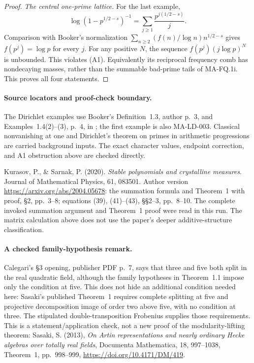 \begin{proof}
\emph{The central one-prime lattice.}
For the last example,
\[
 \log(1-p^{1/2-s})^{-1}
         =\sum_{j\ge1}\frac{p^{j(1/2-s)}}j.
\]
Comparison with Booker's normalization
$\sum_{n\ge2}(f(n)/\log n)n^{1/2-s}$
gives $f(p^j)=\log p$ for every $j$.
For any positive $N$, the sequence
$f(p^j)(j\log p)^N$ is unbounded.
This violates (A1).  Equivalently its reciprocal
frequency comb has nondecaying masses, rather than
the summable bad-prime tails of MA-FQ.1i.
This proves all four statements.
\end{proof}

\paragraph{Source locators and proof-check boundary.}
The Dirichlet examples use Booker's Definition~1.3,
author p.~3, and Examples~1.4(2)--(3), p.~4, in
; the first example is also
MA-LD-003.  Classical nonvanishing at one and
Dirichlet's theorem on primes in arithmetic progressions
are carried background inputs.  The exact character
values, endpoint correction, and A1 obstruction above
are checked directly.

Kurasov, P., \& Sarnak, P. (2020).
\emph{Stable polynomials and crystalline measures}.
Journal of Mathematical Physics, 61, 083501.
Author version \url{https://arxiv.org/abs/2004.05678}:
the summation formula and Theorem~1 with proof,
\S2, pp.~3--8; equations (39), (41)--(43),
\S\S2--3, pp.~8--10.  The complete invoked summation
argument and Theorem~1 proof were read in this run.
The matrix calculation above does not use the paper's
deeper additive-structure classification.

\paragraph{A checked family-hypothesis remark.}
Calegari's \S3 opening, publisher PDF p.~7, says that
three and five both split in the real quadratic field,
although the family hypotheses in Theorem~1.1 impose
only the condition at five.  This does not hide an
additional condition needed here: Sasaki's published
Theorem~1 requires complete splitting at five and
projective decomposition image of order two above
five, with no condition at three.  The stipulated
double-transposition Frobenius supplies those
requirements.  This is a statement/application check,
not a new proof of the modularity-lifting theorem:
Sasaki, S. (2013), \emph{On Artin representations and
nearly ordinary Hecke algebras over totally real fields},
Documenta Mathematica, 18, 997--1038,
Theorem~1, pp.~998--999,
\url{https://doi.org/10.4171/DM/419}.
